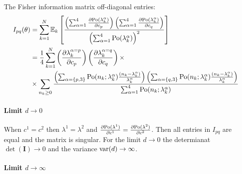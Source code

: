 The Fisher information matrix off-diagonal entries:
%
\begin{alignat*}{2}
	I_{pq}(\theta) 
	& =\sum_{k=1}^N\mathbb{E}_k\left[\frac{\left(\sum_{\alpha=1}^4\frac{\partial\mathrm{Po}(\lambda_k^\alpha)}{\partial c_p}\right)\left(\sum_{\alpha=1}^4\frac{\partial\mathrm{Po}(\lambda_k^\alpha)}{\partial c_q}\right)}{\left(\sum_{\alpha=1}^4\mathrm{Po}(\lambda_k^\alpha)\right)^2}\right]\nonumber \\
 	& =\frac{1}{4}\sum_{k=1}^N\left(\frac{\partial\lambda_k^{\alpha=p}}{\partial c_p}\right)\left(\frac{\partial\lambda_k^{\alpha=q}}{\partial c_q}\right)\times\\
	&\times\sum_{n_k\geq0}\frac{\left(\sum_{\alpha=\{p,3\}}\mathrm{Po}(n_k;\lambda_k^\alpha)\frac{(n_k-\lambda_k^\alpha)}{\lambda_k^\alpha}\right)\left(\sum_{\alpha=\{q,3\}}\mathrm{Po}(n_k;\lambda_k^\alpha)\frac{(n_k-\lambda_k^\alpha)}{\lambda_k^\alpha}\right)}{\sum_{\alpha=1}^4\mathrm{Po}(n_k;\lambda_k^\alpha)}
	\label{eq:Fisher Info Integrated Out-off diagonal entries}
\end{alignat*}

\paragraph*{Limit $d\rightarrow0$}

When $c^1=c^2$ then $\lambda^1=\lambda^2$ and $\frac{\partial\mathrm{Po}(\lambda^1)}{\partial c^1}=\frac{\partial\mathrm{Po}(\lambda^2)}{\partial c^2}$.
Then all entries in $I_{pq}$ are equal and the matrix is singular. For the limit $d\rightarrow0$ the determianat $\det(\bm{I})\rightarrow0$ and the variance $\mathrm{var}(d)\rightarrow\infty$.

\paragraph*{Limit $d\rightarrow\infty$}

